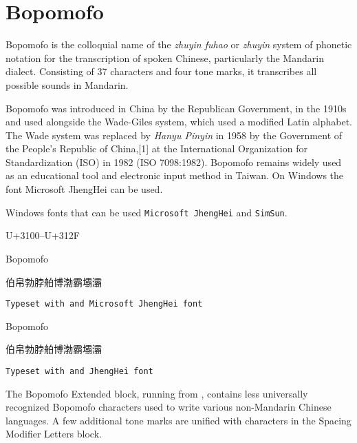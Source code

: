 

\section{Bopomofo}
\label{s:bopomofo}
Bopomofo is the colloquial name of the \textit{zhuyin fuhao} or \textit{zhuyin} system of phonetic notation for the transcription of spoken Chinese, particularly the Mandarin dialect. Consisting of 37 characters and four tone marks, it transcribes all possible sounds in Mandarin. 

Bopomofo was introduced in China by the Republican Government, in the 1910s and used alongside the Wade-Giles system, which used a modified Latin alphabet. The Wade system was replaced by \textit{Hanyu Pinyin} in 1958 by the Government of the People's Republic of China,[1] at the International Organization for Standardization (ISO) in 1982 (ISO 7098:1982). Bopomofo remains widely used as an educational tool and electronic input method in Taiwan. On Windows the font Microsoft JhengHei can be used. 

Windows fonts that can be used \texttt{Microsoft JhengHei} and \texttt{SimSun}.

U+3100–U+312F
\newfontfamily{}

\begin{scriptexample}[]{Bopomofo}
{\centering\bopomofo 

伯帛勃脖舶博渤霸壩灞

}

\hfill \texttt{Typeset with \cmd{\bopomofo} and Microsoft JhengHei font }
\end{scriptexample}

\begin{scriptexample}[]{Bopomofo}

{\centering\bopomofo

伯帛勃脖舶博渤霸壩灞

}
\hfill \texttt{Typeset with \cmd{\bopomofo} and JhengHei font }
\end{scriptexample}


The Bopomofo Extended block, running from , contains less universally recognized Bopomofo characters used to write various non-Mandarin Chinese languages. A few additional tone marks are unified with characters in the Spacing Modifier Letters block. 









